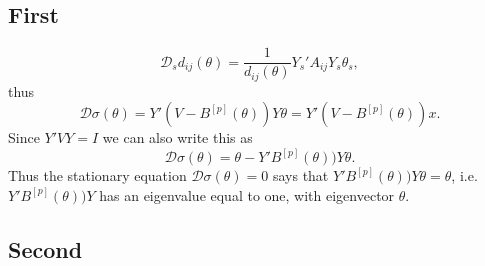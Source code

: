 \documentclass[
  12pt,
]{article}
\begin{document}
\subsection{First}\label{first}

\begin{equation}
\mathcal{D}_sd_{ij}(\theta)=\frac{1}{d_{ij}(\theta)}Y_s'A_{ij}Y_s\theta_s,
\label{eq:firstder}
\end{equation}
thus
\begin{equation}
\mathcal{D}\sigma(\theta)=Y'(V-B^{[p]}(\theta))Y\theta=Y'(V-B^{[p]}(\theta))x.
\label{eq:firder2}
\end{equation}
Since \(Y'VY=I\) we can also write this as
\begin{equation}
\mathcal{D}\sigma(\theta)=\theta-Y'B^{[p]}(\theta))Y\theta.
\label{eq:firder3}
\end{equation}
Thus the stationary equation \(\mathcal{D}\sigma(\theta)=0\) says that
\(Y'B^{[p]}(\theta))Y\theta=\theta\), i.e.~\(Y'B^{[p]}(\theta))Y\)
has an eigenvalue equal to one, with eigenvector \(\theta\).

\subsection{Second}\label{second}
\end{document}
